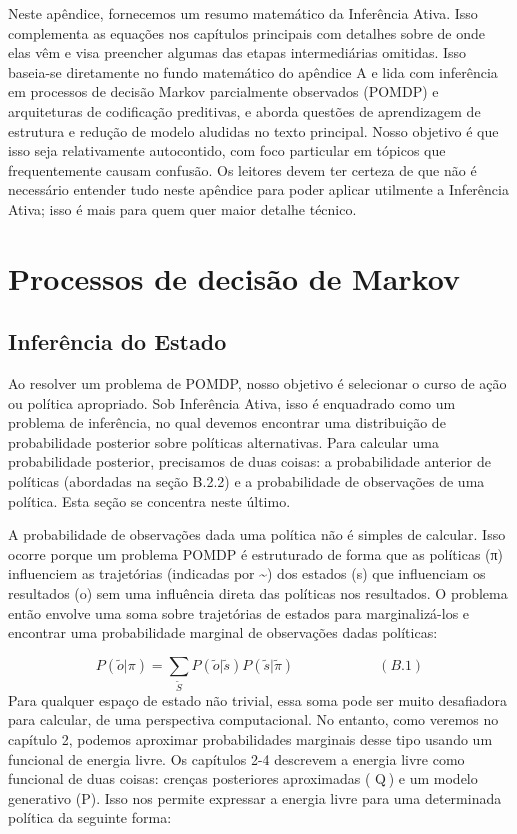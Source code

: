 \documentclass[
  12pt,
]{book}
\begin{document}
Neste apêndice, fornecemos um resumo matemático da Inferência Ativa. Isso complementa as equações nos capítulos principais com detalhes sobre de onde elas vêm e visa preencher algumas das etapas intermediárias omitidas. Isso baseia-se diretamente no fundo matemático do apêndice A e lida com inferência em processos de decisão Markov parcialmente observados (POMDP) e arquiteturas de codificação preditivas, e aborda questões de aprendizagem de estrutura e redução de modelo aludidas no texto principal. Nosso objetivo é que isso seja relativamente autocontido, com foco particular em tópicos que frequentemente causam confusão. Os leitores devem ter certeza de que não é necessário entender tudo neste apêndice para poder aplicar utilmente a Inferência Ativa; isso é mais para quem quer maior
detalhe técnico.

\hypertarget{processos-de-decisuxe3o-de-markov}{%
\section{Processos de decisão de Markov}\label{processos-de-decisuxe3o-de-markov}}

\hypertarget{inferuxeancia-do-estado}{%
\subsection{Inferência do Estado}\label{inferuxeancia-do-estado}}

Ao resolver um problema de POMDP, nosso objetivo é selecionar o curso de ação ou política apropriado. Sob Inferência Ativa, isso é enquadrado como um problema de inferência, no qual devemos encontrar uma distribuição de probabilidade posterior sobre políticas alternativas. Para calcular uma probabilidade posterior, precisamos de duas coisas: a probabilidade anterior de políticas (abordadas na seção B.2.2) e a probabilidade de observações de uma política. Esta seção se concentra neste último.

A probabilidade de observações dada uma política não é simples de calcular. Isso ocorre porque um problema POMDP é estruturado de forma que as políticas (π) influenciem as trajetórias (indicadas por \textasciitilde) dos estados (s) que influenciam os resultados (o) sem uma influência direta das políticas nos resultados. O problema então envolve uma soma sobre trajetórias de estados para marginalizá-los e encontrar
uma probabilidade marginal de observações dadas políticas:

\[P(\tilde o | \pi ) = \sum_\tilde S P(\tilde o | \tilde s)P(\tilde s | \tilde \pi ) \qquad\qquad\qquad (B.1) \]
Para qualquer espaço de estado não trivial, essa soma pode ser muito desafiadora para calcular, de uma perspectiva computacional. No entanto, como veremos no capítulo 2, podemos aproximar probabilidades marginais desse tipo usando um funcional de energia livre. Os capítulos 2-4 descrevem a energia livre como funcional de duas coisas: crenças posteriores aproximadas (
Q ) e um modelo generativo (P). Isso nos permite expressar a energia livre para uma determinada política da seguinte forma:
\end{document}
